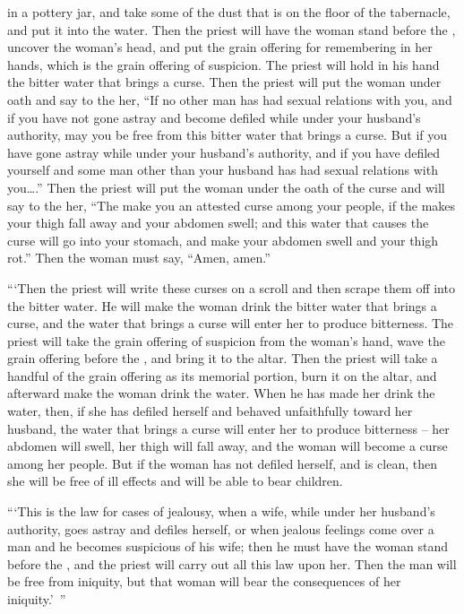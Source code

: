 {in a pottery
jar,
and take
some
of the dust
that
is on the floor
of the tabernacle,
and put
it into
the water.
Then
the priest
will have the
woman
stand
before
the {}, uncover
the woman’s
head,
and put
the
grain offering
for remembering
in her hands,
which is the grain offering
of suspicion.
The priest
will
hold in his hand
the bitter
water
that brings a curse.
Then the priest
will put the woman
under oath
and say
to
the her, “If
no
other man
has
had sexual relations
with
you, and if
you have not
gone astray
and become defiled
while under
your husband’s
authority, may you be free
from this bitter
water
that brings a curse.
But if
you
have gone astray
while under
your husband’s authority, and if
you have defiled
yourself and some man other than
your husband
has had sexual relations with you….”
Then the priest
will put
the woman
under
the oath
of the curse
and will say
to the her,
“The
{}
make
you an attested curse
among
your people,
if the
{}
makes
your thigh
fall away
and your abdomen
swell;
and this
water
that causes the curse
will go into
your stomach,
and make your abdomen
swell
and your thigh
rot.”
Then the woman
must say,
“Amen,
amen.”
\par }{\PP {}“‘Then the priest
will write
these
curses
on a scroll
and then scrape
them off into
the bitter
water.
He will make the
woman
drink
the bitter
water
that brings
a curse,
and the water
that brings a curse
will enter her to produce bitterness.
The priest
will take
the grain offering
of suspicion
from the woman’s
hand,
wave
the
grain offering
before
the {}, and bring
it to
the altar.
Then the priest
will take a handful
of the grain offering
as its memorial
portion, burn
it on the altar,
and afterward
make the
woman
drink
the water.
When he has made her drink
the water,
then, if
she has defiled
herself and behaved
unfaithfully
toward her husband,
the water
that brings
a curse
will enter her to produce bitterness
– her abdomen
will swell,
her thigh
will fall away,
and the woman
will become
a curse
among
her people.
But if
the woman
has not
defiled
herself, and is clean,
then she
will be free
of ill effects
and will be able to bear children.
\par }{\PP {}“‘This
is the law
for cases of jealousy,
when a wife,
while
under
her husband’s authority, goes astray
and defiles herself,
or
when jealous feelings come
over
a
man
and he becomes suspicious
of his wife;
then he must have the woman
stand
before
the {}, and the priest
will carry
out all
this
law
upon her.
Then the man
will be free
from iniquity,
but that woman
will bear
the consequences of her iniquity.’ ”


}
